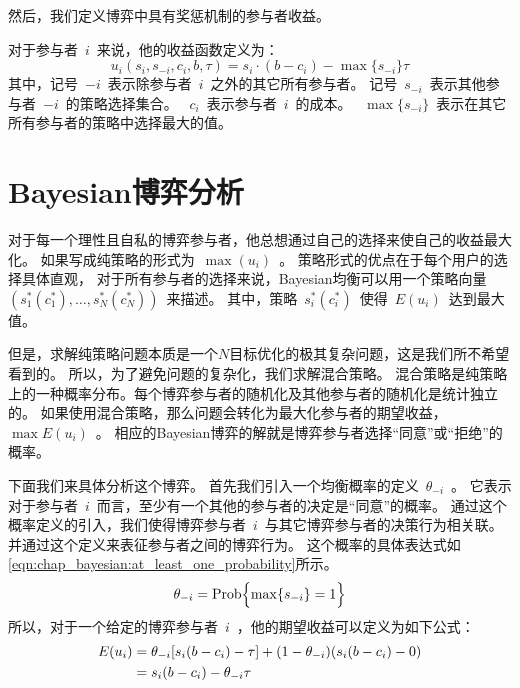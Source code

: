 然后，我们定义博弈中具有奖惩机制的参与者收益。

对于参与者~$i$~来说，他的收益函数定义为：
\begin{equation}
 u_i(s_i, s_{-i}, c_i, b, \tau) = s_i\cdot (b - c_i) - \max\{s_{-i}\} \tau
\label{eqn:chap_bayesian_player_payoff}     
\end{equation}
其中，记号~$-i$~表示除参与者~$i$~之外的其它所有参与者。
记号~$s_{-i}$~表示其他参与者~$-i$~的策略选择集合。
~$c_i$~表示参与者~$i$~的成本。
~$\max\{s_{-i}\}$~表示在其它所有参与者的策略中选择最大的值。
%
\section{Bayesian博弈分析}
对于每一个理性且自私的博弈参与者，他总想通过自己的选择来使自己的收益最大化。
如果写成纯策略的形式为~$\max(u_i)$~。
策略形式的优点在于每个用户的选择具体直观，
对于所有参与者的选择来说，Bayesian均衡可以用一个策略向量~$( s_1^*(c_1^*),\ldots, s_N^*(c_N^*) )$~来描述。
其中，策略~$s_i^*(c_i^*)$~使得~$E(u_i)$~达到最大值。

但是，求解纯策略问题本质是一个$N$目标优化的极其复杂问题，这是我们所不希望看到的。
所以，为了避免问题的复杂化，我们求解混合策略。
混合策略是纯策略上的一种概率分布。每个博弈参与者的随机化及其他参与者的随机化是统计独立的。
如果使用混合策略，那么问题会转化为最大化参与者的期望收益，~$\max{E(u_i)}$~。
相应的Bayesian博弈的解就是博弈参与者选择“同意”或“拒绝”的概率。

下面我们来具体分析这个博弈。
首先我们引入一个均衡概率的定义~$\theta_{-i}$~。
它表示对于参与者~$i$~而言，至少有一个其他的参与者的决定是“同意”的概率。
通过这个概率定义的引入，我们使得博弈参与者~$i$~与其它博弈参与者的决策行为相关联。
并通过这个定义来表征参与者之间的博弈行为。
这个概率的具体表达式如\eqref{eqn:chap_bayesian:at_least_one_probability}所示。
\begin{equation}
    \theta_{-i} = \hbox{Prob} \Bigl\{ \max\{ s_{-i}\} = 1 \Bigr\} 
    \label{eqn:chap_bayesian:at_least_one_probability} 
\end{equation}
所以，对于一个给定的博弈参与者~$i$~，他的期望收益可以定义为如下公式：
\begin{align}
     E(u_i) &= \theta_{-i} [s_i(b-c_i) -\tau] + (1-\theta_{-i}) (s_i(b-c_i) - 0) \notag\\ 
     &= s_i(b-c_i) - \theta_{-i}\tau
    \label{eqn:player_expe_payoff}
\end{align}

